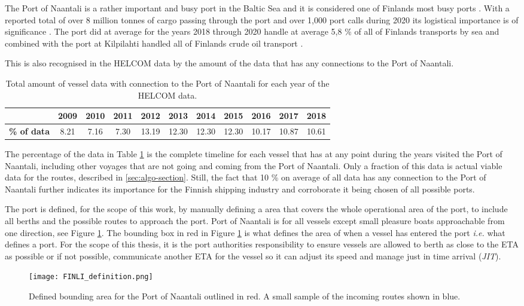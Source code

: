 \documentclass[../main.tex]{subfiles}
\begin{document}
The Port of Naantali is a rather important and busy port in the Baltic Sea and it is considered one of Finlands most busy ports \cite{SVRY_2022}. With a reported total of over 8 million tonnes of cargo passing through the port and over 1,000 port calls during 2020 its logistical importance is of significance \cite{PoN_2021}. The port did at average for the years 2018 through 2020 handle at average 5,8 \% of all of Finlands transports by sea and combined with the port at Kilpilahti handled all of Finlands crude oil transport \cite{TRAFICOM_2021}.

This is also recognised in the HELCOM data by the amount of the data that has any connections to the Port of Naantali.

\begin{table}[H]
\centering
\begin{tabular}{|l|c|c|c|c|c|c|c|c|c|c|}
\hline
\rowcolor[HTML]{C0C0C0} 
\multicolumn{1}{|r|}{\cellcolor[HTML]{C0C0C0}\textbf{Year}} & \textbf{2009} & \textbf{2010} & \textbf{2011} & \textbf{2012} & \textbf{2013} & \textbf{2014} & \textbf{2015} & \textbf{2016} & \textbf{2017} & \textbf{2018} \\ \hline
\textbf{\% of data}                           & 8.21          & 7.16          & 7.30          & 13.19         & 12.30         & 12.30         & 12.30         & 10.17         & 10.87         & 10.61         \\ \hline
\end{tabular}
\caption{Total amount of vessel data with connection to the Port of Naantali for each year of the HELCOM data.}
\label{tab:HELCOM-data-percent}
\end{table}

The percentage of the data in Table \ref{tab:HELCOM-data-percent} is the complete timeline for each vessel that has at any point during the years visited the Port of Naantali, including other voyages that are not going and coming from the Port of Naantali. Only a fraction of this data is actual viable data for the routes, described in \ref{sec:algo-section}. Still, the fact that 10 \% on average of all data has any connection to the Port of Naantali further indicates its importance for the Finnish shipping industry and corroborate it being chosen of all possible ports.

The port is defined, for the scope of this work, by manually defining a area that covers the whole operational area of the port, to include all berths and the possible routes to approach the port. Port of Naantali is for all vessels except small pleasure boats approachable from one direction, see Figure \ref{fig:FINLI-box}. The bounding box in red in Figure \ref{fig:FINLI-box} is what defines the area of when a vessel has entered the port \textit{i.e.} what defines a port. For the scope of this thesis, it is the port authorities responsibility to ensure vessels are allowed to berth as close to the ETA as possible or if not possible, communicate another ETA for the vessel so it can adjust its speed and manage just in time arrival (\textit{JIT}).

\begin{figure}[H]
\centering
\texttt{[image: FINLI\_definition.png]}
\caption{Defined bounding area for the Port of Naantali outlined in red. A small sample of the incoming routes shown in blue.}
\label{fig:FINLI-box}
\end{figure}
\end{document}
